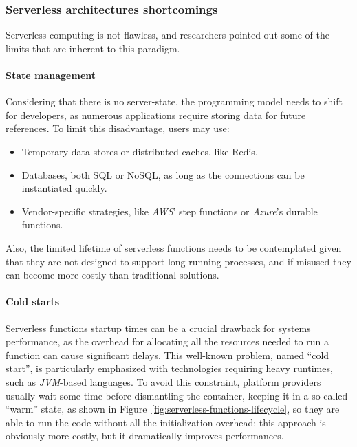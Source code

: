 \subsubsection{Serverless architectures shortcomings}

Serverless computing is not flawless, and researchers \cite{two-steps-back}
pointed out some of the limits that are inherent to this paradigm.

\paragraph{\textbf{State management}} Considering that there is no server-state,
the programming model needs to shift for developers, as numerous applications require
storing data for future references.
To limit this disadvantage, users may use:
\begin{itemize}
  \item Temporary data stores or distributed caches, like Redis.
  \item Databases, both SQL or NoSQL, as long as the connections can be instantiated quickly.
  \item Vendor-specific strategies, like \textit{AWS}' step functions or \textit{Azure}'s durable functions.
\end{itemize}
Also, the limited lifetime of serverless functions needs to be contemplated given that
they are not designed to support long-running processes,
and if misused they can become more costly than traditional solutions.

\paragraph{\textbf{Cold starts}}\label{par:cold-starts} Serverless functions startup times
can be a crucial drawback for systems performance, as the overhead for
allocating all the resources needed to run a function can cause significant
delays. This well-known problem, named ``cold start'', is
particularly emphasized with technologies requiring heavy runtimes, such as \textit{JVM}-based languages.
To avoid this constraint, platform providers usually wait some time
before dismantling the container, keeping it in a so-called ``warm'' state, as shown in Figure~\ref{fig:serverless-functions-lifecycle},
so they are able to run the code without all the initialization overhead:
this approach is obviously more costly, but it dramatically improves performances.

